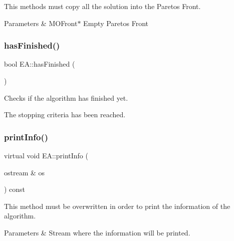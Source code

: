 This methods must copy all the solution into the Pareto\textquotesingle{}s Front. 


\begin{DoxyParams}{Parameters}
{\em } & M\+O\+Front$\ast$ Empty Pareto\textquotesingle{}s Front \\
\hline
\end{DoxyParams}
\mbox{\label{classEA_a1ef25307a0576f54ea6009d4c94c9d48}} 
\subsubsection{\texorpdfstring{has\+Finished()}{hasFinished()}}
{\footnotesize\ttfamily bool E\+A\+::has\+Finished (\begin{DoxyParamCaption}{ }\end{DoxyParamCaption})}



Checks if the algorithm has finished yet. 

The stopping criteria has been reached. \mbox{\label{classEA_a2c495b6198538ee0ecbef9d18ced1f61}} 
\subsubsection{\texorpdfstring{print\+Info()}{printInfo()}}
{\footnotesize\ttfamily virtual void E\+A\+::print\+Info (\begin{DoxyParamCaption}\item[{ostream \&}]{os }\end{DoxyParamCaption}) const\hspace{0.3cm}{\ttfamily [pure virtual]}}



This method must be overwritten in order to print the information of the algorithm. 


\begin{DoxyParams}{Parameters}
{\em } & Stream where the information will be printed. \\
\hline
\end{DoxyParams}
\mbox{\label{classEA_ad56460c346eca5b890b27c85e985ec12}} 
